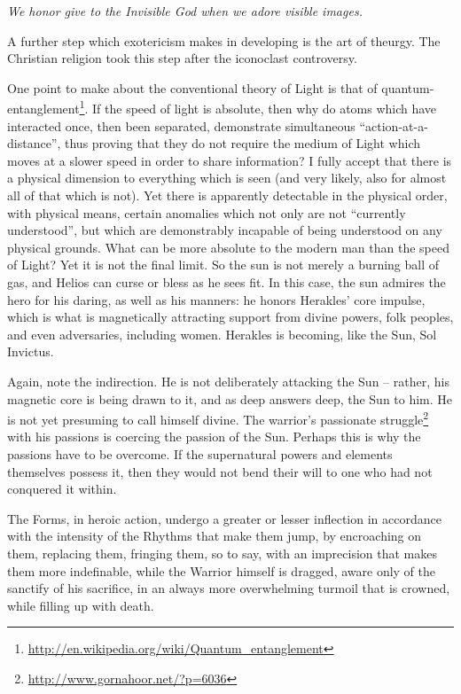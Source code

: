 \emph{We honor give to the Invisible God when we adore visible images.}


A further step which exotericism makes in developing is the art of theurgy. The Christian religion took this step after the iconoclast controversy.

One point to make about the conventional theory of Light is that of quantum-entanglement\footnote{\url{http://en.wikipedia.org/wiki/Quantum\_entanglement}}. If the speed of light is absolute, then why do atoms which have interacted once, then been separated, demonstrate simultaneous ``action-at-a-distance'', thus proving that they do not require the medium of Light which moves at a slower speed in order to share information? I fully accept that there is a physical dimension to everything which is seen (and very likely, also for almost all of that which is not). Yet there is apparently detectable in the physical order, with physical means, certain anomalies which not only are not ``currently understood'', but which are demonstrably incapable of being understood on any physical grounds. What can be more absolute to the modern man than the speed of Light? Yet it is not the final limit. So the sun is not merely a burning ball of gas, and Helios can curse or bless as he sees fit. In this case, the sun admires the hero for his daring, as well as his manners: he honors Herakles' core impulse, which is what is magnetically attracting support from divine powers, folk peoples, and even adversaries, including women. Herakles is becoming, like the Sun, Sol Invictus.

Again, note the indirection. He is not deliberately attacking the Sun -- rather, his magnetic core is being drawn to it, and as deep answers deep, the Sun to him. He is not yet presuming to call himself divine. The warrior's passionate struggle\footnote{\url{http://www.gornahoor.net/?p=6036}} with his passions is coercing the passion of the Sun. Perhaps this is why the passions have to be overcome. If the supernatural powers and elements themselves possess it, then they would not bend their will to one who had not conquered it within.

\begin{quotex}
The Forms, in heroic action, undergo a greater or lesser inflection in accordance with the intensity of the Rhythms that make them jump, by encroaching on them, replacing them, fringing them, so to say, with an imprecision that makes them more indefinable, while the Warrior himself is dragged, aware only of the sanctify of his sacrifice, in an always more overwhelming turmoil that is crowned, while filling up with death.
\end{quotex}


